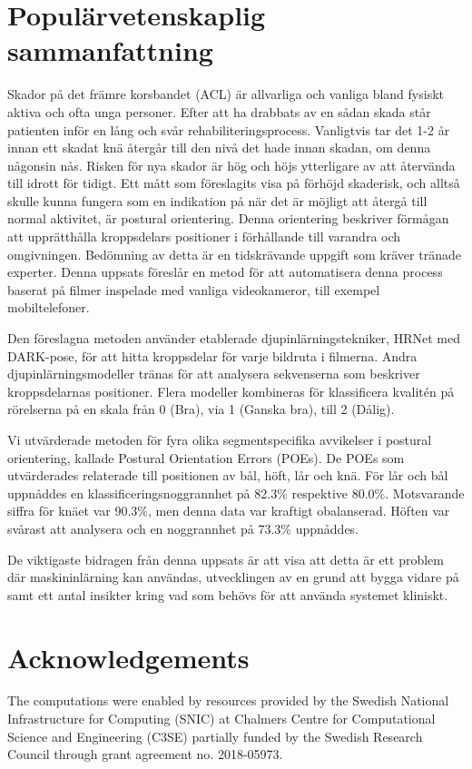 {\chapter*{Populärvetenskaplig sammanfattning}
Skador på det främre korsbandet (ACL) är allvarliga och vanliga bland fysiskt aktiva och ofta unga personer. Efter att ha drabbats av en sådan skada står patienten inför en lång och svår rehabiliteringsprocess. Vanligtvis tar det 1-2 år innan ett skadat knä återgår till den nivå det hade innan skadan, om denna någonsin nås. Risken för nya skador är hög och höjs ytterligare av att återvända till idrott för tidigt.
Ett mått som föreslagits visa på förhöjd skaderisk, och alltså skulle kunna fungera som en indikation på när det är möjligt att återgå till normal aktivitet, är postural orientering. Denna orientering beskriver förmågan att upprätthålla kroppsdelars positioner i förhållande till varandra och omgivningen. Bedömning av detta är en tidskrävande uppgift som kräver tränade experter. Denna uppsats föreslår en metod för att automatisera denna process baserat på filmer inspelade med vanliga videokameror, till exempel mobiltelefoner.

Den föreslagna metoden använder etablerade djupinlärnings\-tekniker, HRNet med DARK-pose, för att hitta kroppsdelar för varje bildruta i filmerna.
Andra djupinlärnings\-modeller tränas för att analysera sekvenserna som beskriver kroppsdelarnas positioner.
Flera modeller kombineras för klassificera kvalitén på rörelserna på en skala från 0 (Bra), via 1 (Ganska bra), till 2 (Dålig).

Vi utvärderade metoden för fyra olika segmentspecifika avvikelser i postural orientering, kallade Postural Orientation Errors (POEs). De POEs som utvärderades relaterade till positionen av bål, höft, lår och knä. För lår och bål uppnåddes en klassificerings\-noggrannhet på 82.3\% respektive 80.0\%. Motsvarande siffra för knäet var 90.3\%, men denna data var kraftigt obalanserad. Höften var svårast att analysera och en noggrannhet på 73.3\% uppnåddes.

De viktigaste bidragen från denna uppsats är att visa att detta är ett problem där maskininlärning kan användas, utvecklingen av en grund att bygga vidare på samt ett antal insikter kring vad som behövs för att använda systemet kliniskt.

\chapter*{Acknowledgements}
The computations were enabled by resources provided by the Swedish National Infrastructure for Computing (SNIC) at Chalmers Centre for Computational Science and Engineering (C3SE) partially funded by the Swedish Research Council through grant agreement no. 2018-05973.

}
